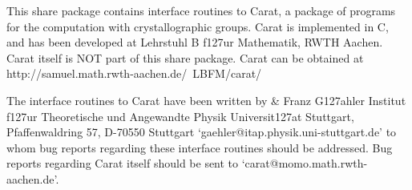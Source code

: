 
This share package contains {\GAP} interface routines to Carat, 
a package of programs for the computation with crystallographic 
groups. Carat is implemented in C, and has been developed at 
Lehrstuhl B f\accent127ur Mathematik, RWTH Aachen. Carat itself 
is NOT part of this share package. Carat can be obtained at
\begintt
http://samuel.math.rwth-aachen.de/~LBFM/carat/
\endtt
 
The {\GAP} interface routines to Carat have been written by
\beginitems
&
Franz G\accent127ahler \hfill\break
Institut f\accent127ur Theoretische und Angewandte Physik \hfill\break
Universit\accent127at Stuttgart, Pfaffenwaldring 57, 
D-70550 Stuttgart\hfill\break
`gaehler@itap.physik.uni-stuttgart.de'
\enditems
to whom bug reports regarding these interface routines should be
addressed. Bug reports regarding Carat itself should be sent to
`carat@momo.math.rwth-aachen.de'.

